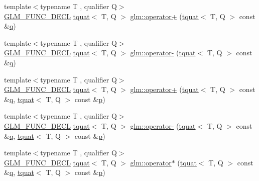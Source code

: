 \begin{DoxyCompactItemize}
\item 
{\footnotesize template$<$typename T , qualifier Q$>$ }\\\mbox{\hyperlink{setup_8hpp_ab2d052de21a70539923e9bcbf6e83a51}{G\+L\+M\+\_\+\+F\+U\+N\+C\+\_\+\+D\+E\+CL}} \mbox{\hyperlink{structglm_1_1tquat}{tquat}}$<$ T, Q $>$ \mbox{\hyperlink{group__gtc__quaternion_ga415c33d49346428f93089f80cf8f9187}{glm\+::operator+}} (\mbox{\hyperlink{structglm_1_1tquat}{tquat}}$<$ T, Q $>$ const \&\mbox{\hyperlink{_s_d_l__opengl_8h_a8fc1e7b9baaae687804c7eed46ca09c6}{q}})
\item 
{\footnotesize template$<$typename T , qualifier Q$>$ }\\\mbox{\hyperlink{setup_8hpp_ab2d052de21a70539923e9bcbf6e83a51}{G\+L\+M\+\_\+\+F\+U\+N\+C\+\_\+\+D\+E\+CL}} \mbox{\hyperlink{structglm_1_1tquat}{tquat}}$<$ T, Q $>$ \mbox{\hyperlink{group__gtc__quaternion_ga594339bbf8d9d11ec27ada0502d4eeaf}{glm\+::operator-\/}} (\mbox{\hyperlink{structglm_1_1tquat}{tquat}}$<$ T, Q $>$ const \&\mbox{\hyperlink{_s_d_l__opengl_8h_a8fc1e7b9baaae687804c7eed46ca09c6}{q}})
\item 
{\footnotesize template$<$typename T , qualifier Q$>$ }\\\mbox{\hyperlink{setup_8hpp_ab2d052de21a70539923e9bcbf6e83a51}{G\+L\+M\+\_\+\+F\+U\+N\+C\+\_\+\+D\+E\+CL}} \mbox{\hyperlink{structglm_1_1tquat}{tquat}}$<$ T, Q $>$ \mbox{\hyperlink{group__gtc__quaternion_ga90911b1428a0a773fa9e0c0952ce25fd}{glm\+::operator+}} (\mbox{\hyperlink{structglm_1_1tquat}{tquat}}$<$ T, Q $>$ const \&\mbox{\hyperlink{_s_d_l__opengl_8h_a8fc1e7b9baaae687804c7eed46ca09c6}{q}}, \mbox{\hyperlink{structglm_1_1tquat}{tquat}}$<$ T, Q $>$ const \&\mbox{\hyperlink{_s_d_l__opengl__glext_8h_aa5367c14d90f462230c2611b81b41d23}{p}})
\item 
{\footnotesize template$<$typename T , qualifier Q$>$ }\\\mbox{\hyperlink{setup_8hpp_ab2d052de21a70539923e9bcbf6e83a51}{G\+L\+M\+\_\+\+F\+U\+N\+C\+\_\+\+D\+E\+CL}} \mbox{\hyperlink{structglm_1_1tquat}{tquat}}$<$ T, Q $>$ \mbox{\hyperlink{group__gtc__quaternion_ga004ef8d57d8c50ec4356e2b8a43e93af}{glm\+::operator-\/}} (\mbox{\hyperlink{structglm_1_1tquat}{tquat}}$<$ T, Q $>$ const \&\mbox{\hyperlink{_s_d_l__opengl_8h_a8fc1e7b9baaae687804c7eed46ca09c6}{q}}, \mbox{\hyperlink{structglm_1_1tquat}{tquat}}$<$ T, Q $>$ const \&\mbox{\hyperlink{_s_d_l__opengl__glext_8h_aa5367c14d90f462230c2611b81b41d23}{p}})
\item 
{\footnotesize template$<$typename T , qualifier Q$>$ }\\\mbox{\hyperlink{setup_8hpp_ab2d052de21a70539923e9bcbf6e83a51}{G\+L\+M\+\_\+\+F\+U\+N\+C\+\_\+\+D\+E\+CL}} \mbox{\hyperlink{structglm_1_1tquat}{tquat}}$<$ T, Q $>$ \mbox{\hyperlink{group__gtc__quaternion_ga447cda99bd10c12696177d490049a8f5}{glm\+::operator$\ast$}} (\mbox{\hyperlink{structglm_1_1tquat}{tquat}}$<$ T, Q $>$ const \&\mbox{\hyperlink{_s_d_l__opengl_8h_a8fc1e7b9baaae687804c7eed46ca09c6}{q}}, \mbox{\hyperlink{structglm_1_1tquat}{tquat}}$<$ T, Q $>$ const \&\mbox{\hyperlink{_s_d_l__opengl__glext_8h_aa5367c14d90f462230c2611b81b41d23}{p}})

\end{DoxyCompactItemize}
